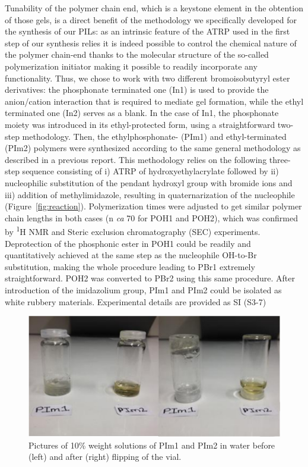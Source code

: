 \documentclass[prl,a4paper,twocolumn,superscriptaddress,showkeys]{revtex4}
\begin{document}
Tunability of the polymer chain end, which is a keystone element in the obtention of those gels, is a direct benefit of the methodology we specifically developed for the synthesis of our PILs: as an intrinsic feature of the ATRP used in the first step of our synthesis relies it is indeed possible to control the chemical nature of the polymer chain-end thanks to the molecular structure of the so-called polymerization initiator making it possible to readily incorporate any functionality. Thus, we chose to work with two different bromoisobutyryl ester derivatives: the phosphonate terminated one (In1) is used to provide the anion/cation interaction that is required to mediate gel formation, while the ethyl terminated one (In2) serves as a blank. In the case of In1, the phosphonate moiety was introduced in its ethyl-protected form, using a straightforward two-step methodology. Then, the ethylphosphonate- (PIm1) and ethyl-terminated (PIm2) polymers were synthesized according to the same general methodology as described in a previous report\cite{Appukuttan2012}. This methodology relies on the following three-step sequence consisting of i) ATRP of hydroxyethylacrylate followed by ii) nucleophilic substitution of the pendant hydroxyl group with bromide ions and iii) addition of methylimidazole, resulting in quaternarization of the nucleophile (Figure~\ref{fig:reaction}). Polymerization times were adjusted to get similar polymer chain lengths in both cases (n \textit{ca} 70 for POH1 and POH2), which was confirmed by \textsuperscript{1}H NMR and Steric exclusion chromatography (SEC) experiments. Deprotection of the phosphonic ester in POH1 could be readily and quantitatively achieved at the same step as the nucleophile OH-to-Br substitution, making the whole procedure leading to PBr1 extremely straightforward. POH2 was converted to PBr2 using this same procedure. After introduction of the imidazolium group, PIm1 and PIm2 could be isolated as white rubbery materials. Experimental details are provided as SI (S3-7) 

\begin{figure}
\includegraphics[]{fig2}
\caption{Pictures of 10\% weight solutions of PIm1 and PIm2 in water before (left) and after (right) flipping of the vial.}
\label{fig:flip}
\end{figure}
\end{document}
